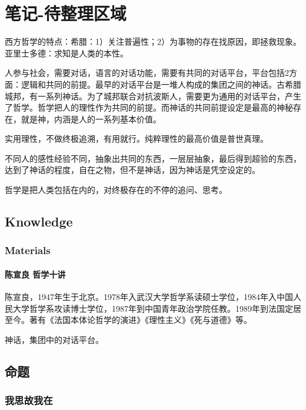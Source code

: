 \documentclass[UTF8]{../RepresentationUniverse}
\begin{document}
\chapter{笔记-待整理区域}


西方哲学的特点：希腊：1）关注普遍性；2）为事物的存在找原因，即拯救现象。
亚里士多德：求知是人类的本性。


人参与社会，需要对话，语言的对话功能，需要有共同的对话平台，平台包括2方面：逻辑和共同的前提。最早的对话平台是一堆人构成的集团之间的神话。古希腊城邦，有一系列神话。为了城邦联合对抗波斯人，需要更为通用的对话平台，产生了哲学。哲学把人的理性作为共同的前提。而神话的共同前提设定是最高的神秘存在，就是神，内涵是人的一系列基本价值。

实用理性，不做终极追溯，有用就行。纯粹理性的最高价值是普世真理。

不同人的感性经验不同，抽象出共同的东西，一层层抽象，最后得到超验的东西，达到了神话的程度，自在之物，但不是神话，因为神话是凭空设定的。

哲学是把人类包括在内的，对终极存在的不停的追问、思考。

\section{Knowledge}

\subsection{Materials}

\subsubsection{ 陈宣良 哲学十讲}
陈宣良，1947年生于北京。1978年入武汉大学哲学系读硕士学位，1984年入中国人民大学哲学系攻读博士学位，1987年到中国青年政治学院任教。1989年到法国定居至今。著有《法国本体论哲学的演进》《理性主义》《死与道德》等。

神话，集团中的对话平台。









\section{命题}

\subsection{我思故我在}
\end{document}
